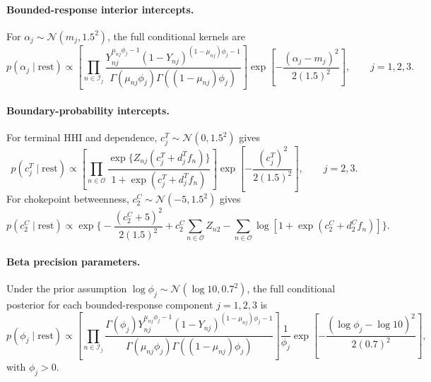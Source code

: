 \documentclass[pdftex,12pt,openright,a4paper,oneside]{book}
\begin{document}
\paragraph{Bounded-response interior intercepts.}

For $\alpha_j\sim\mathcal{N}(m_j,1.5^2)$,
the full conditional kernels are
\begin{equation}
p(\alpha_j\mid\mathrm{rest})
\propto
\left[
\prod_{n\in\mathcal{I}_j}
\frac{
Y_{nj}^{\mu_{nj}\phi_j-1}
(1-Y_{nj})^{(1-\mu_{nj})\phi_j-1}
}{
\Gamma(\mu_{nj}\phi_j)
\Gamma((1-\mu_{nj})\phi_j)
}
\right]
\exp\left[
-\frac{(\alpha_j-m_j)^2}{2(1.5)^2}
\right],
\qquad j=1,2,3.
\label{eq:fc_beta_intercept}
\end{equation}

\paragraph{Boundary-probability intercepts.}

For terminal HHI and dependence,
$c_j^T\sim\mathcal{N}(0,1.5^2)$ gives
\begin{equation}
p(c_j^T\mid\mathrm{rest})
\propto 
\left[
\prod_{n\in\mathcal{O}}
\frac{
\exp\{Z_{nj}(c_j^T+d_j^T f_n)\}
}{
1+\exp(c_j^T+d_j^T f_n)
}
\right]
\exp\left[
-\frac{(c_j^T)^2}{2(1.5)^2}
\right],
\qquad j=2,3.
\label{eq:fc_one_intercept}
\end{equation}
For chokepoint betweenness,
$c_2^C\sim\mathcal{N}(-5,1.5^2)$ gives
\begin{equation}
p(c_2^C\mid\mathrm{rest})
\propto
\exp\Bigg\{-\frac{(c_2^C+5)^2}{2(1.5)^2}
+c_2^C\sum_{n\in\mathcal{O}}Z_{n2}-
\sum_{n\in\mathcal{O}}
\log\left[1+\exp(c_2^C+d_2^C f_n)\right]
\Bigg\}.
\label{eq:fc_zero_intercept}
\end{equation}

\paragraph{Beta precision parameters.}

Under the prior assumption $\log\phi_j\sim\mathcal{N}(\log10,0.7^2)$,
the full conditional posterior for each bounded-response component $j=1,2,3$ is
\begin{equation}
p(\phi_j\mid\mathrm{rest})
\propto
\left[
\prod_{n\in\mathcal{I}_j}
\frac{
\Gamma(\phi_j)
Y_{nj}^{\mu_{nj}\phi_j-1}
(1-Y_{nj})^{(1-\mu_{nj})\phi_j-1}
}{
\Gamma(\mu_{nj}\phi_j)
\Gamma((1-\mu_{nj})\phi_j)
}
\right]
\frac{1}{\phi_j}
\exp\left[
-\frac{(\log\phi_j-\log10)^2}{2(0.7)^2}
\right],
\label{eq:fc_precision}
\end{equation}
with $\phi_j>0$.
\end{document}
